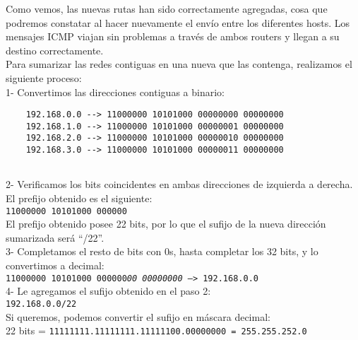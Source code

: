 \documentclass{article}
\begin{document}
Como vemos, las nuevas rutas han sido correctamente agregadas, cosa que podremos constatar al hacer nuevamente el env\'io entre los diferentes hosts. Los mensajes ICMP viajan sin problemas a trav\'es de ambos routers y llegan a su destino correctamente. \\

Para sumarizar las redes contiguas en una nueva que las contenga, realizamos el siguiente proceso: \\

1- Convertimos las direcciones contiguas a binario:
\begin{verbatim}
    192.168.0.0 --> 11000000 10101000 00000000 00000000
    192.168.1.0 --> 11000000 10101000 00000001 00000000
    192.168.2.0 --> 11000000 10101000 00000010 00000000
    192.168.3.0 --> 11000000 10101000 00000011 00000000
    
\end{verbatim}

2- Verificamos los bits coincidentes en ambas direcciones de izquierda a derecha. El prefijo obtenido es el siguiente: \\

\texttt{11000000 10101000 000000} \\

El prefijo obtenido posee 22 bits, por lo que el sufijo de la nueva direcci\'on sumarizada ser\'a ``/22''. \\

3- Completamos el resto de bits con 0s, hasta completar los 32 bits, y lo convertimos a decimal: \\

\texttt{11000000 10101000 000000\textit{00 00000000} --> 192.168.0.0} \\

4- Le agregamos el sufijo obtenido en el paso 2: \\

\texttt{192.168.0.0/22} \\

Si queremos, podemos convertir el sufijo en m\'ascara decimal: \\

22 bits = \texttt{11111111.11111111.11111100.00000000 = 255.255.252.0} \\\\
\end{document}
